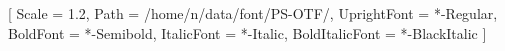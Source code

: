 
\usepackage[no-math,no-config]{fontspec}

\setmainfont{Linux Libertine O}
\setsansfont{Linux Biolinum O}
\setmonofont{Source Code Pro}


\newfontfamily{}[
  Scale = 1.2,
  Path = /home/n/data/font/PS-OTF/,
  UprightFont = *-Regular,
  BoldFont = *-Semibold,
  ItalicFont = *-Italic,
  BoldItalicFont = *-BlackItalic
]







